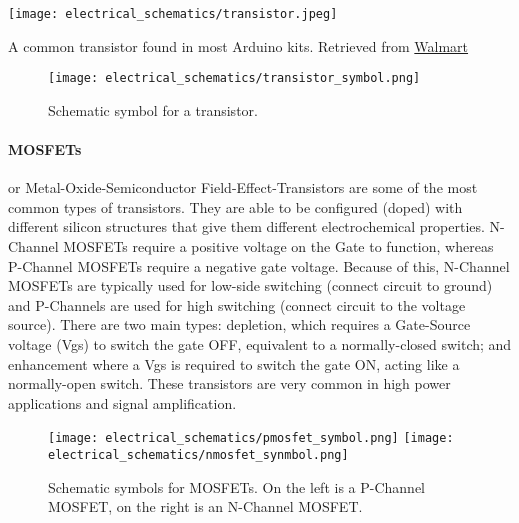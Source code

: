         \begin{marginfigure}[-1in]
            \texttt{[image: electrical\_schematics/transistor.jpeg]}
            \caption{A common transistor found in most Arduino kits.
            Retrieved from \href{https://www.walmart.com/ip/2N2222A-Plastic-Encapsulate-Power-Transistor-NPN-TO-92-25PCS/283496991}{Walmart}}
        \end{marginfigure}

        \begin{figure}[h!]
            \texttt{[image: electrical\_schematics/transistor\_symbol.png]}
            \caption[Switch Symbols]{Schematic symbol for a transistor.}
        \end{figure}

        \paragraph*{MOSFETs} or Metal-Oxide-Semiconductor Field-Effect-Transistors are some of the most common types of transistors.
        They are able to be configured (doped) with different silicon structures that give them different electrochemical properties.
        N-Channel MOSFETs require a positive voltage on the Gate to function, whereas P-Channel MOSFETs require a negative gate voltage.
        Because of this, N-Channel MOSFETs are typically used for low-side switching (connect circuit to ground) and P-Channels are used for high switching (connect circuit to the voltage source). 
        There are two main types: depletion, which requires a Gate-Source voltage (Vgs) to switch the gate OFF, equivalent to a normally-closed switch; and enhancement where a Vgs is required to switch the gate ON, acting like a normally-open switch.
        These transistors are very common in high power applications and signal amplification.

        \begin{figure}[h!]
            \texttt{[image: electrical\_schematics/pmosfet\_symbol.png]}
            \texttt{[image: electrical\_schematics/nmosfet\_synmbol.png]}
            \caption[Switch Symbols]{Schematic symbols for MOSFETs.
            On the left is a P-Channel MOSFET, on the right is an N-Channel MOSFET.}
        \end{figure}


